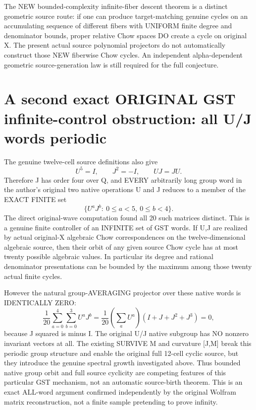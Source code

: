 \documentclass{article}
\begin{document}
The NEW bounded-complexity infinite-fiber
descent theorem is a distinct geometric
source route: if one can produce target-matching
genuine cycles on an accumulating sequence of
different fibers with UNIFORM finite degree
and denominator bounds, proper relative
Chow spaces DO create a cycle on original X.
The present actual source polynomial projectors
do not automatically construct those NEW
fiberwise Chow cycles. An independent
alpha-dependent geometric source-generation
law is still required for the full conjecture.

\section{A second exact ORIGINAL GST infinite-control obstruction: all U/J words periodic}
The genuine twelve-cell source definitions also give
\[
U^5=I,\qquad J^2=-I,\qquad UJ=JU.
\]
Therefore J has order four over Q, and EVERY
arbitrarily long group word in the author's
original two native operations U and J
reduces to a member of the EXACT FINITE set
\[
\{U^a J^b:\ 0\le a<5,\ 0\le b<4\}.
\]
The direct original-wave computation found all
20 such matrices distinct. This is a genuine
finite controller of an INFINITE set of GST
words. If U,J are realized by actual original-X
algebraic Chow correspondences on the
twelve-dimensional algebraic source, then
their orbit of any given source Chow cycle
has at most twenty possible algebraic values.
In particular its degree and rational
denominator presentations can be bounded
by the maximum among those twenty
actual finite cycles.

However the natural group-AVERAGING projector
over these native words is IDENTICALLY ZERO:
\[
\boxed{
\frac1{20}\sum_{a=0}^4\sum_{b=0}^3 U^aJ^b
=\frac1{20}\left(\sum_a U^a\right)
 (I+J+J^2+J^3)=0,
}
\]
because J squared is minus I.
The original U/J native subgroup has
NO nonzero invariant vectors at all.
The existing SURVIVE M and curvature
[J,M] break this periodic group structure
and enable the original full 12-cell
cyclic source, but they introduce the
genuine spectral growth investigated above.
Thus bounded native group orbit and
full source cyclicity are competing
features of this particular GST mechanism,
not an automatic source-birth theorem.
This is an exact ALL-word argument
confirmed independently by the original
Wolfram matrix reconstruction, not a
finite sample pretending to prove infinity.
\end{document}
